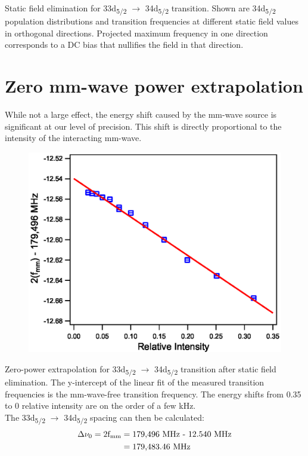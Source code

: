 \documentclass[landscape]{sciposter}
\begin{document}
\begin{multicols}{4}
Static field elimination for 33d\textsubscript{5/2} $\rightarrow$ 34d\textsubscript{5/2} transition. Shown are 34d\textsubscript{5/2} population distributions and transition frequencies at different static field values in orthogonal directions. Projected maximum frequency in one direction corresponds to a DC bias that nullifies the field in that direction.

\section*{\large Zero mm-wave power extrapolation}
While not a large effect, the energy shift caused by the mm-wave source is significant at our level of precision. This shift is directly proportional to the intensity of the interacting mm-wave. 

\begin{figure}
\begin{center}
\includegraphics[scale = 1.25]{33d52_PScans.eps}
\end{center}
\end{figure}

Zero-power extrapolation for 33d\textsubscript{5/2} $\rightarrow$ 34d\textsubscript{5/2} transition after static field elimination. The y-intercept of the linear fit of the measured transition frequencies is the mm-wave-free transition frequency. The energy shifts from 0.35 to 0 relative intensity are on the order of a few kHz.\\

The 33d\textsubscript{5/2} $\rightarrow$ 34d\textsubscript{5/2} spacing can then be calculated:
\begin{align*}
\Delta \nu_0 = \textrm{2f\textsubscript{mm}} &= \textrm{179,496 MHz - 12.540 MHz} \\ &= \textrm{179,483.46 MHz}
\end{align*}




\end{multicols}
\end{document}
